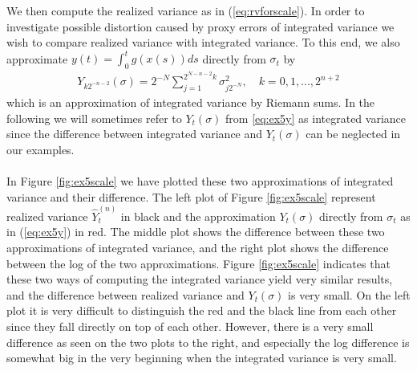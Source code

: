 \documentclass{article}
\begin{document}
We then compute the realized variance as in (\ref{eq:rvforscale}). In order to investigate possible distortion caused by proxy errors of integrated variance we wish to compare realized variance with integrated variance. To this end, we also approximate $y(t) = \int_0^t g\left(x(s)\right) ds$ directly from $\sigma_t$ by 
\begin{align}
Y_{k2^{-n-2}}(\sigma)= 2^{-N} \sum_{j=1}^{2^{N-n-2}k} \sigma^2_{j2^{-N}}, \quad k=0,1,...,2^{n+2} \label{eq:ex5y}
\end{align}
which is an approximation of integrated variance by Riemann sums. In the following we will sometimes refer to $Y_t(\sigma)$ from \eqref{eq:ex5y} as integrated variance since the difference between integrated variance and $Y_t(\sigma)$ can be neglected in our examples.\\\\
In Figure \ref{fig:ex5scale} we have plotted these two approximations of integrated variance and their difference. The left plot of Figure \ref{fig:ex5scale} represent realized variance $\widehat{Y}_t^{(n)}$ in black and the approximation $Y_t(\sigma)$ directly from $\sigma_t$ as in (\ref{eq:ex5y}) in red. The middle plot shows the difference between these two approximations of integrated variance, and the right plot shows the difference between the log of the two approximations. Figure \ref{fig:ex5scale} indicates that these two ways of computing the integrated variance yield very similar results, and the difference between realized variance and $Y_t(\sigma)$ is very small. On the left plot it is very difficult to distinguish the red and the black line from each other since they fall directly on top of each other. However, there is a very small difference as seen on the two plots to the right, and especially the log difference is somewhat big in the very beginning when the integrated variance is very small.
\end{document}
